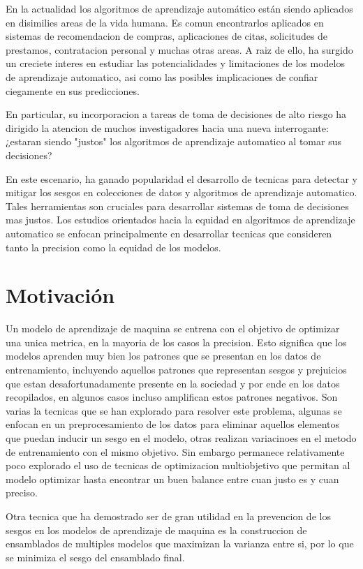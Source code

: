 En la actualidad los algoritmos de aprendizaje automático están siendo aplicados en disimilies areas de la vida humana. Es comun encontrarlos aplicados en sistemas de recomendacion de compras, aplicaciones de citas, solicitudes de prestamos, contratacion personal y muchas otras areas.  A raiz de ello, ha surgido un creciete interes en estudiar las potencialidades y limitaciones de los modelos de aprendizaje automatico, asi como las posibles implicaciones de confiar ciegamente en sus predicciones.

En particular, su incorporacion a tareas de toma de decisiones de alto riesgo ha dirigido la atencion de muchos investigadores hacia una nueva interrogante: ¿estaran siendo "justos" los algoritmos de aprendizaje automatico al tomar sus decisiones?

En este escenario, ha ganado popularidad el desarrollo de tecnicas para detectar y mitigar los sesgos en colecciones de datos y algoritmos de aprendizaje automatico. Tales herramientas son cruciales para desarrollar sistemas de toma de decisiones mas justos. Los estudios orientados hacia la equidad en algoritmos de aprendizaje automatico se enfocan principalmente en desarrollar tecnicas que consideren tanto la precision como la equidad de los modelos.

\section*{Motivación}

Un modelo de aprendizaje de maquina se entrena con el objetivo de optimizar una unica metrica, en la mayoria de los casos la precision. Esto significa que los modelos aprenden muy bien los patrones que se presentan en los datos de entrenamiento, incluyendo aquellos patrones que representan sesgos y prejuicios que estan desafortunadamente presente en la sociedad y por ende en los datos recopilados, en algunos casos incluso amplifican estos patrones negativos. Son varias la tecnicas que se han explorado para resolver este problema, algunas se enfocan en un preprocesamiento de los datos para eliminar aquellos elementos que puedan inducir un sesgo en el modelo, otras realizan variacinoes en el metodo de entrenamiento con el mismo objetivo. Sin embargo permanece relativamente poco explorado el uso de tecnicas de optimizacion multiobjetivo que permitan al modelo optimizar hasta encontrar un buen balance entre cuan justo es y cuan preciso.

Otra tecnica que ha demostrado ser de gran utilidad en la prevencion de los sesgos en los modelos de aprendizaje de maquina es la construccion de ensamblados de multiples modelos que maximizan la varianza entre si, por lo que se minimiza el sesgo del ensamblado final.

